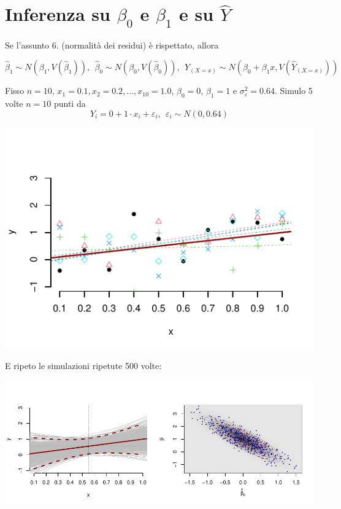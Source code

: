 \documentclass[
  11pt,
]{book}
\theoremstyle{mytheoremstyle}
\theoremstyle{mydefstyle}
\begin{document}
\section{\texorpdfstring{Inferenza su \(\beta_0\) e \(\beta_1\) e su \(\hat Y\)}{Inferenza su \textbackslash beta\_0 e \textbackslash beta\_1 e su \textbackslash hat Y}}\label{inferenza-su-beta_0-e-beta_1-e-su-hat-y}

Se l'assunto 6. (normalità dei residui) è rispettato, allora

\begin{info}
\[\hat\beta_1\sim N(\beta_1,V(\hat\beta_1)), ~~\hat\beta_0\sim N(\beta_0,V(\hat\beta_0)), ~~\hat Y_{(X=x)}\sim N\left(\beta_0+\beta_1 x,V(\hat Y_{(X=x)})\right)\]

\end{info}

Fisso \(n=10\), \(x_1=0.1,x_2=0.2,...,x_{10}=1.0\), \(\beta_0=0\), \(\beta_1=1\) e \(\sigma_\varepsilon^2=0.64\). Simulo 5 volte \(n=10\) punti da
\[Y_i = 0 + 1\cdot x_i + \varepsilon_i,~~\varepsilon_i\sim N(0,0.64)\]

\begin{center}\includegraphics{Appunti_di_Statistica_2025_files/figure-latex/18-regressione-II-4-1} \end{center}

E ripeto le simulazioni ripetute 500 volte:

\begin{center}\includegraphics{Appunti_di_Statistica_2025_files/figure-latex/18-regressione-II-5-1} \end{center}
\end{document}
